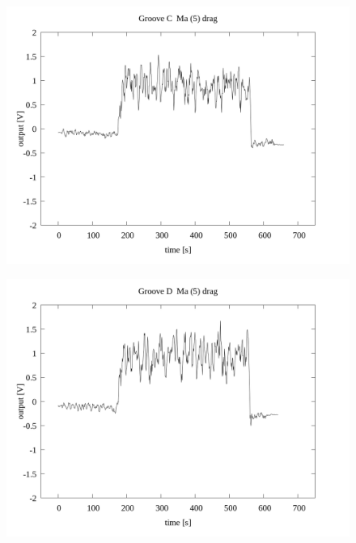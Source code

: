 \documentclass[a4paper]{jsarticle}
\begin{document}
\begin{figure}[htbp]
    \footnotesize
    \begin{center}
        \includegraphics[width=140mm]{../../../../33_result/210806/moving_average/5/drag/01/Groove_C_ma(5)_drag_01.png}
    \end{center}
\end{figure}

\begin{figure}[htbp]
    \footnotesize
    \begin{center}
        \includegraphics[width=140mm]{../../../../33_result/210806/moving_average/5/drag/01/Groove_D_ma(5)_drag_01.png}
    \end{center}
\end{figure}
\end{document}
